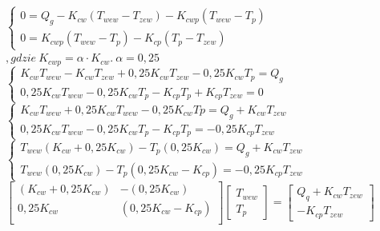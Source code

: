 \documentclass{article}
\begin{document}
\begin{center}
    $
    \begin{cases}
        0=Q_{g} -K_{cw} (T_{wew} - T_{zew})-K_{cwp} (T_{wew} -T_{p})\\
        0=K_{cwp}(T_{wew}-T_{p})-K_{cp}(T_{p}-T_{zew})
    \end{cases}
    $
    \vspace{1ex}
    $
    ,gdzie \ K_{cwp}=\alpha\cdot K_{cw}.\ \alpha=0,25
    $
    \vspace{1ex}
    $
    \begin{cases}
        K_{cw}T_{wew}-K_{cw}T_{zew}+0,25K_{cw}T_{zew}-0,25K_{cw}T_{p}=Q_{g}\\
        0,25K_{cw}T_{wew}-0,25K_{cw}T_{p}-K_{cp}T_{p}+K_{cp}T_{zew}=0
    \end{cases}
    $
    \vspace{1ex}
    $
        \begin{cases}
            K_{cw}T_{wew}+0,25K_{cw}T_{wew}-0,25K_{cw}T{p}=Q_{g}+K_{cw}T_{zew}\\
            0,25K_{cw}T_{wew}-0,25K_{cw}T_{p}-K_{cp}T_{p}=-0,25K_{cp}T_{zew}
        \end{cases}
    $
    \vspace{1ex}
    $
        \begin{cases}
            T_{wew}(K_{cw}+0,25K_{cw})-T_{p}(0,25K_{cw})=Q_{g}+K_{cw}T_{zew}\\
            T_{wew}(0,25K_{cw})-T_{p}(0,25K_{cw}-K_{cp})=-0,25K_{cp}T_{zew}
        \end{cases}
    $
    \vspace{1ex}\\
    $
    \begin{bmatrix}
        (K_{cw}+0,25K_{cw})& -(0,25K_{cw})            \\[0.3em]
        0,25K_{cw} & (0,25K_{cw}-K_{cp})            \\[0.3em]
    \end{bmatrix}
    \begin{bmatrix}
        T_{wew}\\
        T_{p}
    \end{bmatrix}
    =
    \begin{bmatrix}
        Q_{q}+K_{cw}T_{zew}\\
        -K_{cp}T_{zew}
    \end{bmatrix}
    $
    \vspace{1ex}
\end{center}
\end{document}
